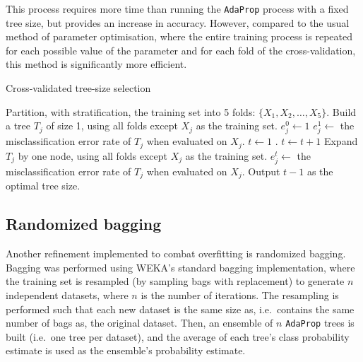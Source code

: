 \documentclass[a4paper,12pt]{report} %
\newcommand{\AdaProp}{\texttt{AdaProp}\xspace}
\begin{document}
This process requires more time than running 
    the \AdaProp process with a fixed tree size, 
    but provides an increase in accuracy.
However, compared to the usual method of parameter optimisation, 
    where the entire training process is repeated for each possible 
    value of the parameter 
	and for each fold of the cross-validation,
    this method is significantly more efficient.


\begin{algorithm}[t]
\caption{Cross-validated tree-size selection}
\label{algoCVTSS} 
    \begin{algorithmic}
    \State Partition, with stratification, the training set into 5 folds: 
        $\{ X_1, X_2, \ldots, X_5 \}$.
        \State Build a tree $T_j$ of size 1, using all folds except $X_j$ as the training set.
        \State $e^0_j \gets 1$ 
        \State $e^1_j \gets$ the misclassification error rate of $T_j$ when evaluated on $X_j$.        
    \EndFor    
    \State $t \gets 1$ .    
        \State $t \gets t+1$
            \State Expand $T_j$ by one node, 
                using all folds except $X_j$ as the training set.
            \State $e^t_j \gets$ the misclassification error rate of $T_j$ when evaluated on $X_j$.
        \EndFor
    \EndWhile
    \State Output $t-1$ as the optimal tree size.
    \end{algorithmic}
\end{algorithm}


\subsection{Randomized bagging}
\label{methodRandBag}

Another refinement implemented to combat overfitting is 
    randomized bagging.
Bagging was performed using WEKA's standard bagging implementation, 
    where the training set is resampled (by sampling bags with replacement) to generate
    $n$ independent datasets, where $n$ is the number of iterations.
The resampling is performed such that each new dataset is the same size as, 
	i.e.\ contains the same number of bags as, the original dataset.
Then, an ensemble of $n$ \AdaProp trees is built (i.e.\ one tree per dataset), 
    and the average of each tree's class probability estimate is used as the ensemble's probability estimate.
\end{document}
